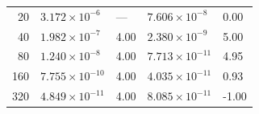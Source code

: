 \documentclass[10pt]{beamer}
\begin{document}
\begin{frame}
\begin{table}
\begin{tabular}{r*{4}l}
      \midrule
      20    & \( 3.172 \times 10^{-6}  \)   & ---                           & \( 7.606 \times 10^{-8}  \) & 0.00  \\
      40    & \( 1.982 \times 10^{-7}  \)   & 4.00                          & \( 2.380 \times 10^{-9}  \) & 5.00  \\
      80    & \( 1.240 \times 10^{-8}  \)   & 4.00                          & \( 7.713 \times 10^{-11} \) & 4.95  \\
      160   & \( 7.755 \times 10^{-10} \)   & 4.00                          & \( 4.035 \times 10^{-11} \) & 0.93  \\
      320   & \( 4.849 \times 10^{-11} \)   & 4.00                          & \( 8.085 \times 10^{-11} \) & -1.00 \\
      \bottomrule
    \end{tabular}
  \end{table}
\end{frame}
\end{document}
